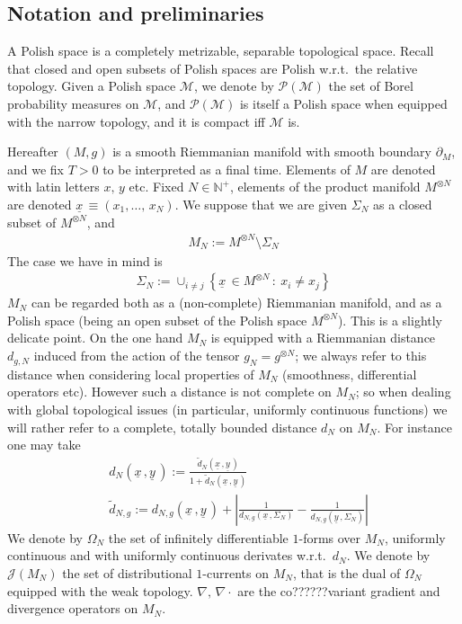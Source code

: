 \documentclass[reqno]{amsart}
\numberwithin{equation}{section}
\numberwithin{theorem}{section}
\newcommand{\mc}[1]{{\mathcal #1}}
\newcommand{\bb}[1]{{\mathbb #1}}
\newcommand{\downbar}[1]{\underline{#1\!}\,}
\newcommand{\bel}[2]{\begin{equation} \label{#1} \begin{split} #2
 \end{split} \end{equation}}
\newcommand{\undx}{\downbar{x}}
\newcommand{\undy}{\downbar{y}}
\begin{document}
\newpage



\subsection{Notation and preliminaries}
\label{ss:2.2}
A Polish space is a completely metrizable, separable topological space. Recall that closed and open subsets of Polish spaces are Polish w.r.t.\ the relative topology. Given a Polish space $\mc M$, we denote by $\mc P(\mc M)$ the set of Borel probability measures on $\mc M$, and $\mc P(\mc M)$ is itself a Polish space when equipped with the narrow topology, and it is compact iff $\mc M$ is.

Hereafter $(M,g)$ is a smooth Riemmanian manifold with smooth boundary $\partial_M$, and we fix $T>0$ to be interpreted as a final time. Elements of $M$ are denoted with latin letters $x,\,y$ etc. Fixed $N\in \bb N^+$, elements of the product manifold $M^{\otimes N}$ are denoted $\undx\equiv (x_1,\ldots,\,x_N)$. We suppose that we are given $\Sigma_N$ as a closed subset of $M^{\otimes N}$, and
\bel{e:mn}{
M_N:=M^{\otimes N}\setminus \Sigma_N
}
The case we have in mind is
\bel{e:mn2}{
\Sigma_N:=\cup_{i\neq j} \left\{\downbar x\in M^{\otimes N}\,:\:x_i\neq x_j \right\}
}
$M_N$ can be regarded both as a (non-complete) Riemmanian manifold, and as a Polish space (being an open subset of the Polish space $M^{\otimes N}$). This is a slightly delicate point. On the one hand $M_N$ is equipped with a Riemmanian distance $d_{g,N}$ induced from the action of the tensor $g_N=g^{\otimes N}$; we always refer to this distance when considering local properties of $M_N$ (smoothness, differential operators etc). However such a distance is not complete on $M_N$; so when dealing with global topological issues (in particular, uniformly continuous functions) we will rather refer to a complete, totally bounded distance $d_N$ on $M_N$. For instance one may take
\bel{e:dn}{
& d_N(\undx, \undy):= \frac{\tilde d_N(\undx, \undy)}{1+\tilde d_N(\undx, \undy)}
\\
& \tilde d_{N,g}:=d_{N,g}(\undx,\undy)+\left|\tfrac{1}{d_{N,g}(\undx,\Sigma_N)} - \tfrac{1}{d_{N,g}(\undy,\Sigma_N)} \right|
}
We denote by $\Omega_N$ the set of infinitely differentiable $1$-forms over $M_N$, uniformly continuous and with  uniformly continuous derivates w.r.t.\ $d_N$. We denote by $\mc J(M_N)$ the set of distributional $1$-currents on $M_N$, that is the dual of $\Omega_N$ equipped with the weak topology. $\nabla,\,\nabla\cdot$ are the co??????variant gradient and divergence operators on $M_N$.
\end{document}
